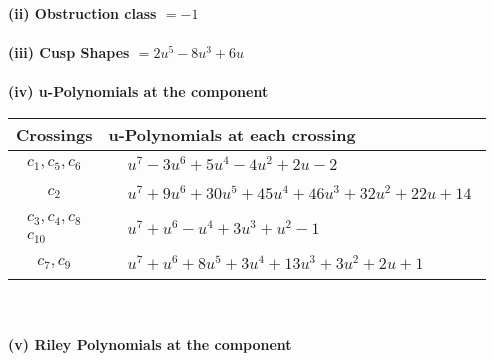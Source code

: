 \documentclass[1p]{elsarticle_modified}
\theoremstyle{definition}
\begin{document}
\flushleft \textbf{(ii) Obstruction class $= -1$}\\~\\
\flushleft \textbf{(iii) Cusp Shapes $= 2 u^5-8 u^3+6 u$}\\~\\
\newpage\renewcommand{\arraystretch}{1}
\flushleft \textbf{(iv) u-Polynomials at the component}\newline \\
\begin{tabular}{m{50pt}|m{274pt}}
Crossings & \hspace{64pt}u-Polynomials at each crossing \\
\hline $$\begin{aligned}c_{1},c_{5},c_{6}\end{aligned}$$&$\begin{aligned}
&u^7-3 u^6+5 u^4-4 u^2+2 u-2
\end{aligned}$\\
\hline $$\begin{aligned}c_{2}\end{aligned}$$&$\begin{aligned}
&u^7+9 u^6+30 u^5+45 u^4+46 u^3+32 u^2+22 u+14
\end{aligned}$\\
\hline $$\begin{aligned}c_{3},c_{4},c_{8}\\c_{10}\end{aligned}$$&$\begin{aligned}
&u^7+u^6- u^4+3 u^3+u^2-1
\end{aligned}$\\
\hline $$\begin{aligned}c_{7},c_{9}\end{aligned}$$&$\begin{aligned}
&u^7+u^6+8 u^5+3 u^4+13 u^3+3 u^2+2 u+1
\end{aligned}$\\
\hline
\end{tabular}\\~\\
\newpage\renewcommand{\arraystretch}{1}
\flushleft \textbf{(v) Riley Polynomials at the component}\newline \\
\end{document}
